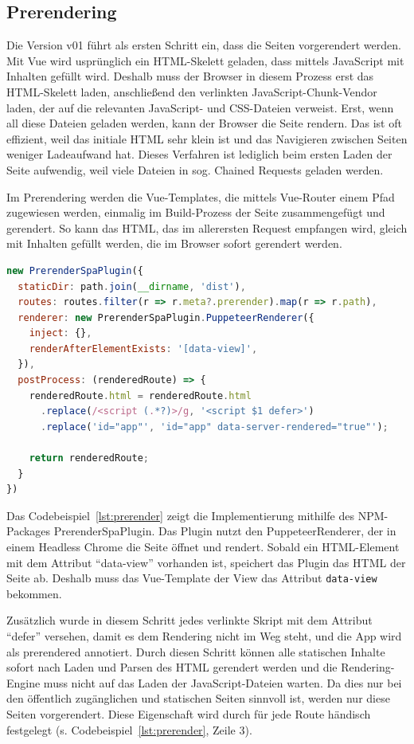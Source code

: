 \documentclass[11pt,a4paper]{article}
\begin{document}
\subsection{Prerendering}
Die Version v01 führt als ersten Schritt ein, dass die Seiten vorgerendert werden.
Mit Vue wird usprünglich ein HTML-Skelett geladen, dass mittels JavaScript mit Inhalten gefüllt wird.
Deshalb muss der Browser in diesem Prozess erst das HTML-Skelett laden, anschließend den verlinkten JavaScript-Chunk-Vendor laden, der auf die relevanten JavaScript- und CSS-Dateien verweist.
Erst, wenn all diese Dateien geladen werden, kann der Browser die Seite rendern.
Das ist oft effizient, weil das initiale HTML sehr klein ist und das Navigieren zwischen Seiten weniger Ladeaufwand hat.
Dieses Verfahren ist lediglich beim ersten Laden der Seite aufwendig, weil viele Dateien in sog. Chained Requests geladen werden.

Im Prerendering werden die Vue-Templates, die mittels Vue-Router einem Pfad zugewiesen werden, einmalig im Build-Prozess der Seite zusammengefügt und gerendert.
So kann das HTML, das im allerersten Request empfangen wird, gleich mit Inhalten gefüllt werden, die im Browser sofort gerendert werden.

\begin{lstlisting}[language=JavaScript, caption={Implementierung des Single Page Prerenderings}, label={lst:prerender}]
new PrerenderSpaPlugin({
  staticDir: path.join(__dirname, 'dist'),
  routes: routes.filter(r => r.meta?.prerender).map(r => r.path),
  renderer: new PrerenderSpaPlugin.PuppeteerRenderer({
    inject: {},
    renderAfterElementExists: '[data-view]',
  }),
  postProcess: (renderedRoute) => {
    renderedRoute.html = renderedRoute.html
      .replace(/<script (.*?)>/g, '<script $1 defer>')
      .replace('id="app"', 'id="app" data-server-rendered="true"');

    return renderedRoute;
  }
})
\end{lstlisting}

Das Codebeispiel~\ref{lst:prerender} zeigt die Implementierung mithilfe des NPM-Packages PrerenderSpaPlugin.
Das Plugin nutzt den PuppeteerRenderer, der in einem Headless Chrome die Seite öffnet und rendert.
Sobald ein HTML-Element mit dem Attribut \enquote{data-view} vorhanden ist, speichert das Plugin das HTML der Seite ab.
Deshalb muss das Vue-Template der View das Attribut \verb|data-view| bekommen.

Zusätzlich wurde in diesem Schritt jedes verlinkte Skript mit dem Attribut \enquote{defer} versehen, damit es dem Rendering nicht im Weg steht, und die App wird als prerendered annotiert. 
Durch diesen Schritt können alle statischen Inhalte sofort nach Laden und Parsen des HTML gerendert werden und die Rendering-Engine muss nicht auf das Laden der JavaScript-Dateien warten.
Da dies nur bei den öffentlich zugänglichen und statischen Seiten sinnvoll ist, werden nur diese Seiten vorgerendert.
Diese Eigenschaft wird durch für jede Route händisch festgelegt (s. Codebeispiel~\ref{lst:prerender}, Zeile 3).
\end{document}
